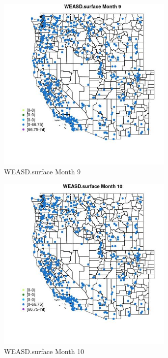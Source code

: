 \begin{figure} 
\centering  
\includegraphics[width=0.77\textwidth]{Code_Outputs/Report_ML_input_PM25_Step4_part_e_de_duplicated_aves_compiled_2019-05-14wNAs_MapObsMo9WEASDsurface.jpg} 
\caption{\label{fig:Report_ML_input_PM25_Step4_part_e_de_duplicated_aves_compiled_2019-05-14wNAsMapObsMo9WEASDsurface}WEASD.surface Month 9} 
\end{figure} 
 

\begin{figure} 
\centering  
\includegraphics[width=0.77\textwidth]{Code_Outputs/Report_ML_input_PM25_Step4_part_e_de_duplicated_aves_compiled_2019-05-14wNAs_MapObsMo10WEASDsurface.jpg} 
\caption{\label{fig:Report_ML_input_PM25_Step4_part_e_de_duplicated_aves_compiled_2019-05-14wNAsMapObsMo10WEASDsurface}WEASD.surface Month 10} 
\end{figure} 
 


